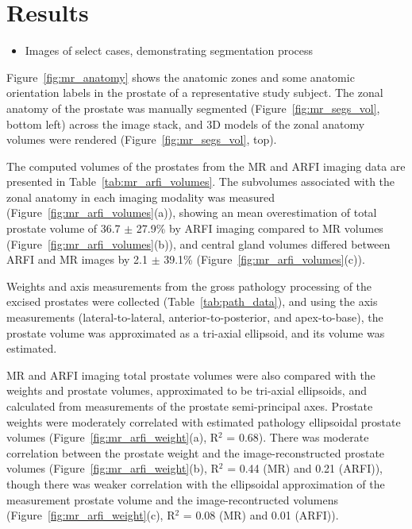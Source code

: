 \section{Results}\label{sect:results}

\begin{itemize}
    \item Images of select cases, demonstrating segmentation process
\end{itemize}

Figure~\ref{fig:mr_anatomy} shows the anatomic zones and some anatomic
orientation labels in the prostate of a representative study subject.  The
zonal anatomy of the prostate was manually segmented
(Figure~\ref{fig:mr_segs_vol}, bottom left) across the image stack, and 3D
models of the zonal anatomy volumes were rendered
(Figure~\ref{fig:mr_segs_vol}, top).





The computed volumes of the prostates from the MR and ARFI imaging data are
presented in Table~\ref{tab:mr_arfi_volumes}.  The subvolumes associated with
the zonal anatomy in each imaging modality was measured
(Figure~\ref{fig:mr_arfi_volumes}(a)), showing an mean overestimation of total
prostate volume of 36.7 $\pm$ 27.9\% by ARFI imaging compared to MR volumes
(Figure~\ref{fig:mr_arfi_volumes}(b)), and central gland volumes differed
between ARFI and MR images by 2.1 $\pm$ 39.1\%
(Figure~\ref{fig:mr_arfi_volumes}(c)).





Weights and axis measurements from the gross pathology processing of the
excised prostates were collected (Table~\ref{tab:path_data}), and using the
axis measurements (lateral-to-lateral, anterior-to-posterior, and
apex-to-base), the prostate volume was approximated as a tri-axial ellipsoid,
and its volume was estimated.



MR and ARFI imaging total prostate volumes were also compared with the weights
and prostate volumes, approximated to be tri-axial ellipsoids, and calculated
from measurements of the prostate semi-principal axes.  Prostate weights were
moderately correlated with estimated pathology ellipsoidal prostate volumes
(Figure~\ref{fig:mr_arfi_weight}(a), R$^2$ = 0.68).  There was moderate
correlation between the prostate weight and the image-reconstructed prostate
volumes (Figure~\ref{fig:mr_arfi_weight}(b), R$^2$ = 0.44 (MR) and 0.21
(ARFI)), though there was weaker correlation with the ellipsoidal approximation
of the measurement prostate volume and the image-recontructed volumens
(Figure~\ref{fig:mr_arfi_weight}(c), R$^2$ = 0.08 (MR) and 0.01 (ARFI)).  

